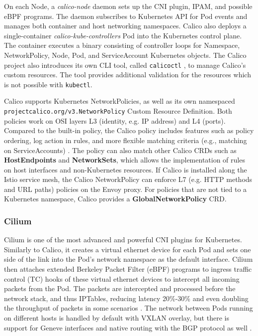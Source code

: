 \documentclass[english, 12pt, a4paper, sci, utf8, a-2b, online]{aaltothesis}
\newcommand{\mycomment}[3]{\textcolor{#1}{#2:~#3}}
\newcommand{\jb}[1]{\noindent\mycomment{aaltoRed}{JB}{#1}}
\begin{document}
On each Node, a \emph{calico-node} daemon sets up the CNI plugin, IPAM, and possible eBPF programs.
The daemon subscribes to Kubernetes API for Pod events and manages both container and host networking namespaces.
Calico also deploys a single-container \emph{calico-kube-controllers} Pod into the Kubernetes control plane.
The container executes a binary consisting of controller loops for Namespace, NetworkPolicy, Node, Pod, and ServiceAccount Kubernetes objects.
The Calico project also introduces its own CLI tool, called \lstinline{calicoctl} \cite{calicoctl}, to manage Calico's custom resources.
The tool provides additional validation for the resources which is not possible with \lstinline{kubectl}.

Calico supports Kubernetes NetworkPolicies, as well as its own namespaced \lstinline{projectcalico.org/v3.NetworkPolicy} Custom Resource Definition.
Both policies work on OSI layers L3 (identity, e.g. IP address) and L4 (ports).
Compared to the built-in policy, the Calico policy includes features such as policy ordering, log action in rules, and more flexible matching criteria (e.g., matching on ServiceAccounts) \cite{calico-network-policy}.
The policy can also match other Calico CRDs such as \textbf{HostEndpoints} and \textbf{NetworkSets}, which allows the implementation of rules on host interfaces and non-Kubernetes resources.
If Calico is installed along the Istio service mesh, the Calico NetworkPolicy can enforce L7 (e.g. HTTP methods and URL paths) policies on the Envoy proxy. For policies that are not tied to a Kubernetes namespace, Calico provides a \textbf{GlobalNetworkPolicy} CRD.


\subsubsection{Cilium}

Cilium \cite{cilium} is one of the most advanced and powerful CNI plugins for Kubernetes.
Similarly to Calico, it creates a virtual ethernet device for each Pod and sets one side of the link into the Pod's network namespace \cite{cilium-tkng} as the default interface.
Cilium then attaches extended Berkeley Packet Filter (eBPF) programs to ingress traffic control (TC) hooks of these virtual ethernet devices to intercept all incoming packets from the Pod.
The packets are intercepted and processed before the network stack, and thus IPTables, reducing latency 20\%-30\% and even doubling the throughput of packets in some scenarios \cite{budigiri2021network}.
The network between Pods running on different hosts is handled by default with VXLAN overlay, but there is support for Geneve interfaces and native routing with the BGP protocol as well \cite{cilium}.
\end{document}

